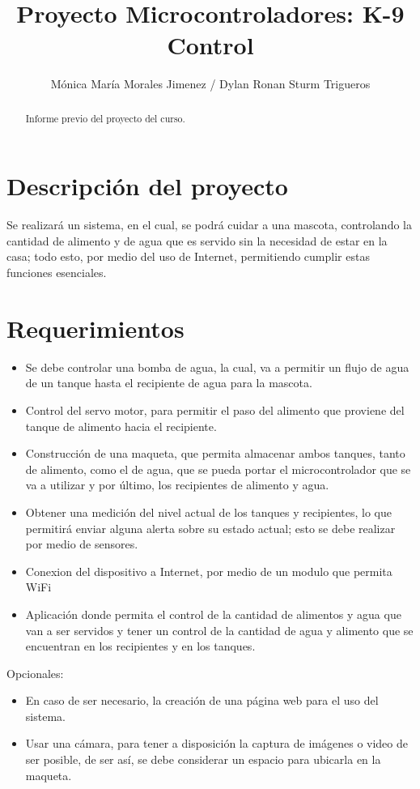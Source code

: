 \documentclass[12pt,letterpaper]{IEEEtran}
\title{Proyecto Microcontroladores: K-9 Control}
\author{Mónica María Morales Jimenez / Dylan Ronan Sturm Trigueros}
\begin{document}
\renewcommand{\leftmark}{UNIVERSIDAD LATINA DE COSTA RICA -- BINGE-61 Microcontroladores}

\maketitle


\begin{abstract}
Informe previo del proyecto del curso.
\end{abstract}

\section{Descripción del proyecto}

Se realizará un sistema, en el cual, se podrá cuidar a una mascota, controlando la cantidad de alimento y de agua que es servido sin la necesidad de estar en la casa; todo esto, por medio del uso de Internet, permitiendo cumplir estas funciones esenciales. 

\section{Requerimientos}

\begin{itemize}
	\item Se debe controlar una bomba de agua, la cual, va a permitir un flujo de agua de un tanque hasta el recipiente de agua para la mascota.
	\item Control del servo motor, para permitir el paso del alimento que proviene del tanque de alimento hacia el recipiente.
	\item Construcción de una maqueta, que permita almacenar ambos tanques, tanto de alimento, como el de agua, que se pueda portar el microcontrolador que se va a utilizar y por último, los recipientes de alimento y agua.
	\item Obtener una medición del nivel actual de los tanques y recipientes, lo que permitirá enviar alguna alerta sobre su estado actual; esto se debe realizar por medio de sensores.
	\item Conexion del dispositivo a Internet, por medio de un modulo que permita WiFi
	\item Aplicación donde permita el control de la cantidad de alimentos y agua que van a ser servidos y tener un control de la cantidad de agua y alimento que se encuentran en los recipientes y en los tanques. 
\end{itemize}
Opcionales:

\begin{itemize}
	\item En caso de ser necesario, la creación de una página web para el uso del sistema.
	\item Usar una cámara, para tener a disposición la captura de imágenes o video de ser posible, de ser así, se debe considerar un espacio para ubicarla en la maqueta.
\end{itemize}
\end{document}
